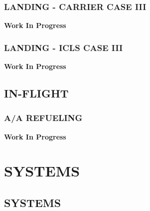 \documentclass[fontInter]{TechCheck}
\begin{document}
	\vfill\null
	\clearpage


	\subsection{LANDING - CARRIER CASE III}
	\begin{center}
	\end{center}

	\begin{center}
		\large \textbf{Work In Progress} \normalsize
	\end{center}

	\subsection{LANDING - ICLS CASE III}
	\begin{center}
		\large \textbf{Work In Progress} \normalsize
	\end{center}

	\clearpage

	\section{IN-FLIGHT}

	\subsection{A/A REFUELING}
	\begin{center}
		\large \textbf{Work In Progress} \normalsize
	\end{center}

	\cleardoublepage

	\chapter{SYSTEMS}
	\minitoc
	\cleardoublepage

	\section{SYSTEMS}
\end{document}
